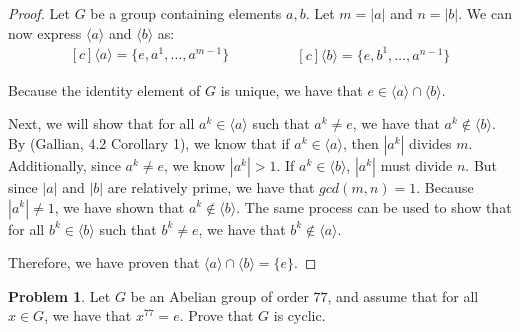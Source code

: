 \documentclass[12pt,reqno]{article}
\theoremstyle{plain}
\theoremstyle{definition}
\newtheorem{problem}{Problem}
\begin{document}
\begin{proof}
    Let \(G\) be a group containing elements \(a,b\). Let \(m=|a|\) and \(n=|b|\). We can now express \(\langle a\rangle\) and \(\langle b\rangle\) as:
    \begin{equation*}
        \begin{aligned}[c]
            \langle a\rangle = \{e,a^1,\ldots,a^{m-1}\}
        \end{aligned}
        \qquad\qquad
        \begin{aligned}[c]
            \langle b\rangle = \{e,b^1,\ldots,a^{n-1}\}
        \end{aligned}
    \end{equation*}
    
    Because the identity element of \(G\) is unique, we have that \(e\in\langle a\rangle\cap\langle b\rangle\).
    
    Next, we will show that for all \(a^k\in\langle a\rangle\) such that \(a^k\neq e\), we have that \(a^k\notin\langle b\rangle\).
    By (Gallian, 4.2 Corollary 1), we know that if \(a^k\in\langle a\rangle\), then \(|a^k|\) divides \(m\). Additionally, since \(a^k\neq e\),
    we know \(|a^k|>1\). If \(a^k\in\langle b\rangle\), \(|a^k|\) must divide \(n\). But since \(|a|\) and \(|b|\) are relatively prime, we have that \(gcd(m,n)=1\). Because
    \(|a^k|\neq 1\), we have shown that \(a^k\notin\langle b\rangle\). The same process can be used to show that for all \(b^k\in\langle b\rangle\) such that \(b^k\neq e\),
    we have that \(b^k\notin\langle a\rangle\).

    Therefore, we have proven that \(\langle a\rangle\cap\langle b\rangle=\{e\}\).
\end{proof}

\newpage


\begin{problem}
    Let \(G\) be an Abelian group of order \(77\), and assume that for all \(x\in G\), we have that
    \(x^{77}=e\). Prove that \(G\) is cyclic.
\end{problem}
\end{document}
